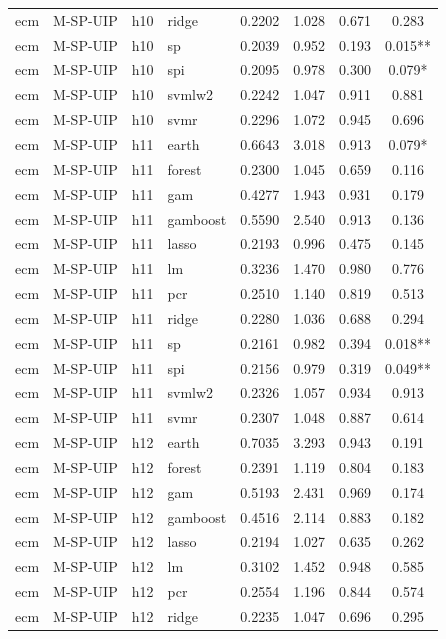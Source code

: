 \begin{ThreePartTable}
\begin{longtable}[t]{llclcccc}
ecm & M-SP-UIP & h10 & ridge & 0.2202 & 1.028 & 0.671 & 0.283\\
ecm & M-SP-UIP & h10 & sp & 0.2039 & 0.952 & 0.193 & 0.015**\\
ecm & M-SP-UIP & h10 & spi & 0.2095 & 0.978 & 0.300 & 0.079*\\
ecm & M-SP-UIP & h10 & svmlw2 & 0.2242 & 1.047 & 0.911 & 0.881\\
ecm & M-SP-UIP & h10 & svmr & 0.2296 & 1.072 & 0.945 & 0.696\\
\addlinespace
ecm & M-SP-UIP & h11 & earth & 0.6643 & 3.018 & 0.913 & 0.079*\\
ecm & M-SP-UIP & h11 & forest & 0.2300 & 1.045 & 0.659 & 0.116\\
ecm & M-SP-UIP & h11 & gam & 0.4277 & 1.943 & 0.931 & 0.179\\
ecm & M-SP-UIP & h11 & gamboost & 0.5590 & 2.540 & 0.913 & 0.136\\
ecm & M-SP-UIP & h11 & lasso & 0.2193 & 0.996 & 0.475 & 0.145\\
ecm & M-SP-UIP & h11 & lm & 0.3236 & 1.470 & 0.980 & 0.776\\
ecm & M-SP-UIP & h11 & pcr & 0.2510 & 1.140 & 0.819 & 0.513\\
ecm & M-SP-UIP & h11 & ridge & 0.2280 & 1.036 & 0.688 & 0.294\\
ecm & M-SP-UIP & h11 & sp & 0.2161 & 0.982 & 0.394 & 0.018**\\
ecm & M-SP-UIP & h11 & spi & 0.2156 & 0.979 & 0.319 & 0.049**\\
ecm & M-SP-UIP & h11 & svmlw2 & 0.2326 & 1.057 & 0.934 & 0.913\\
ecm & M-SP-UIP & h11 & svmr & 0.2307 & 1.048 & 0.887 & 0.614\\
\addlinespace
ecm & M-SP-UIP & h12 & earth & 0.7035 & 3.293 & 0.943 & 0.191\\
ecm & M-SP-UIP & h12 & forest & 0.2391 & 1.119 & 0.804 & 0.183\\
ecm & M-SP-UIP & h12 & gam & 0.5193 & 2.431 & 0.969 & 0.174\\
ecm & M-SP-UIP & h12 & gamboost & 0.4516 & 2.114 & 0.883 & 0.182\\
ecm & M-SP-UIP & h12 & lasso & 0.2194 & 1.027 & 0.635 & 0.262\\
ecm & M-SP-UIP & h12 & lm & 0.3102 & 1.452 & 0.948 & 0.585\\
ecm & M-SP-UIP & h12 & pcr & 0.2554 & 1.196 & 0.844 & 0.574\\
ecm & M-SP-UIP & h12 & ridge & 0.2235 & 1.047 & 0.696 & 0.295\\

\end{longtable}
\end{ThreePartTable}
